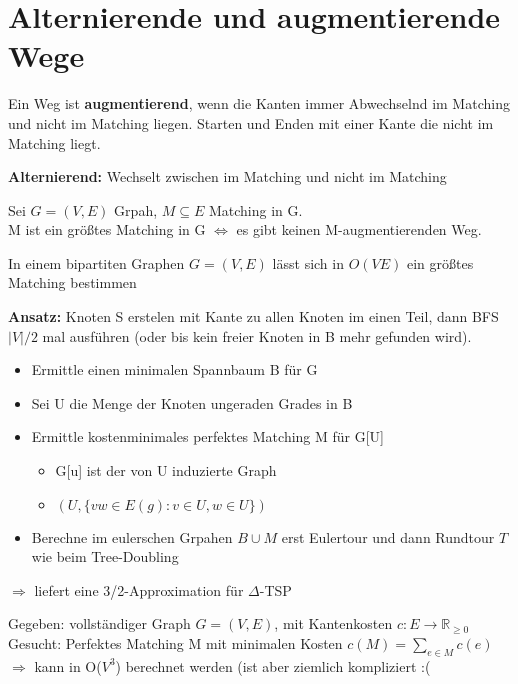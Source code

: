 \documentclass[14pt]{article}
\begin{document}
\section{Alternierende und augmentierende Wege}
\begin{definition}
    Ein Weg ist \textbf{augmentierend}, wenn die Kanten immer Abwechselnd im
    Matching und nicht im Matching liegen. Starten und Enden mit einer Kante
    die nicht im Matching liegt.
\end{definition}
\textbf{Alternierend:} Wechselt zwischen im Matching und nicht im Matching
\begin{definition}
    Sei $G = (V, E)$ Grpah, $M \subseteq E$ Matching in G. \\
    M ist ein größtes Matching in G $\Leftrightarrow$ es gibt keinen
    M-augmentierenden Weg.
\end{definition}
\begin{eigenschaft}
    In einem bipartiten Graphen $G = (V, E)$ lässt sich in $O(VE)$ ein größtes
    Matching bestimmen
\end{eigenschaft}
\textbf{Ansatz:} Knoten S erstelen mit Kante zu allen Knoten im einen Teil, dann BFS 
$|V| / 2$ mal ausführen (oder bis kein freier Knoten in B mehr gefunden wird). 
\begin{definition}
    \begin{itemize}
        \item Ermittle einen minimalen Spannbaum B für G
        \item Sei U die Menge der Knoten ungeraden Grades in B
        \item Ermittle kostenminimales perfektes Matching M für G[U]
        \begin{itemize}
            \item G[u] ist der von U induzierte Graph
            \item $(U, \{ vw \in E(g): v \in U, w \in U\})$
        \end{itemize}
        \item Berechne im eulerschen Grpahen $B \cup M$ erst Eulertour und dann 
        Rundtour $T$ wie beim Tree-Doubling
    \end{itemize}
    $\Rightarrow$ liefert eine 3/2-Approximation für $\varDelta$-TSP
\end{definition}
\begin{definition}
    Gegeben: vollständiger Graph $G = (V, E)$, mit Kantenkosten $c: E \rightarrow 
    \mathbb{R}_{\geq 0}$ \\
    Gesucht: Perfektes Matching M mit minimalen Kosten $c(M) = \sum_{e \in M} c(e)$ \\
    $\Rightarrow$ kann in O($V^3$) berechnet werden (ist aber ziemlich kompliziert :(
\end{definition}
\end{document}
